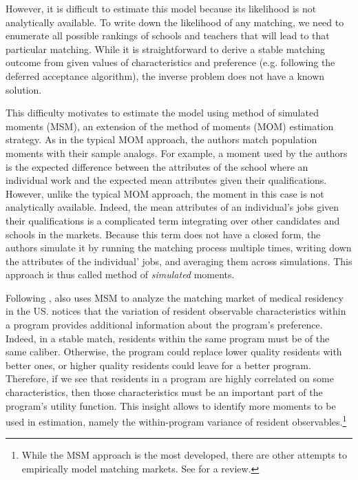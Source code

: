 However, it is difficult to estimate this model because its likelihood is not
analytically available. To write down the likelihood of any matching,
we need to enumerate all possible rankings of schools and teachers that will
lead to that particular matching. While it is straightforward to derive a stable
matching outcome from given values of characteristics and preference (e.g.
following the deferred acceptance algorithm), the inverse problem does not have
a known solution.

This difficulty motivates \citet{Boyd2013} to estimate the model using method of
simulated moments (MSM), an extension of the method of moments (MOM) estimation
strategy. As in the typical MOM approach, the authors match population moments
with their sample analogs. For example, a moment used by the authors is the
expected difference between the attributes of the school where an individual
work and the expected mean attributes given their qualifications. However,
unlike the typical MOM approach, the moment in this case is not analytically
available. Indeed, the mean attributes of an individual's jobs given their
qualifications is a complicated term integrating over other candidates and
schools in the markets. Because this term does not have a closed form, the
authors simulate it by running the matching process multiple times, writing down
the attributes of the individual' jobs, and averaging them across simulations.
This approach is thus called method of \textit{simulated} moments.

Following \citet{Boyd2013}, \citet{Agarwal2015} also uses MSM to analyze the
matching market of medical residency in the US. \citet{Agarwal2015} notices that
the variation of resident observable characteristics within a program 
provides additional information about the program's preference. Indeed, in a stable match,
residents within the same program must be of the same caliber. Otherwise, the
program could replace lower quality residents with better ones, or
higher quality residents could leave for a better program. Therefore, if we see
that residents in a program are highly correlated on some characteristics, then
those characteristics must be an important part of the program's utility
function. This insight allows \citet{Agarwal2015} to identify more moments to be
used in estimation, namely the within-program variance of resident
observables.\footnote{While the MSM approach is the most developed, there are
  other attempts to empirically model matching markets. See \citet{Fox2009} for
  a review.}

